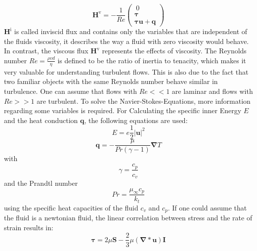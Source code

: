 \documentclass[a4paper,10pt]{article}
\renewcommand*\vec[1]{\boldsymbol{#1}}
\renewcommand*\matrix[1]{\boldsymbol{#1}}
\numberwithin{equation}{section} %
\begin{document}
\begin{equation}
 \vec{H^\mathrm{v}} = - \frac{1}{Re} \left( \begin{array}{c}\ 0 \\ \matrix{\tau}\\ \matrix{\tau} \vec{u} + \vec{q} \end{array} \right)
\end{equation}
\nomenclature{$\matrix{\tau}$}{Stress tensor}
\nomenclature{$\vec{q}$}{Heat conduction}
$ \vec{H^\mathrm{i}} $ is called inviscid flux and contains only the variables that are independent of the fluids viscosity, it describes the way a fluid 
with zero viscosity would behave. In contrast, the viscous flux $ \vec{H^\mathrm{v}} $ represents the effects of viscosity. The Reynolds number 
$ Re = \frac{\rho v d}{\eta} $ is defined to be the ratio of inertia to tenacity, which makes it very valuable for understanding turbulent flows. This is also due to the 
fact that two familiar objects with the same Reynolds number behave similar in turbulence. One can assume that flows with $ Re << 1 $ are laminar and flows with 
$ Re >> 1 $ are turbulent.
To solve the Navier-Stokes-Equations, more information regarding some variables is required. For Calculating the specific inner Energy $ E $ 
and the heat conduction $ \vec{q} $, the following equations are used:
\begin{equation}
 E = e  \frac{1}{2} \vec{|u|}^2
\end{equation}
\begin{equation}
 \vec{q} = - \frac{\mu}{Pr (\gamma - 1)} \vec\nabla T
\end{equation}
with 
\begin{equation}
 \gamma = \frac{c_p}{c_v}
\end{equation}
and the Prandtl number
\begin{equation}
 Pr = \frac{\mu_\infty c_p}{k_t}
\end{equation}
using the specific heat capacities of the fluid $ c_v $ and $ c_p $.
If one could assume that the fluid is a newtonian fluid, the linear correlation between stress and the rate of strain results in:
\begin{equation}
 \matrix{\tau} = 2 \mu \matrix{S} - \frac{2}{3} \mu (\vec\nabla * \vec{u}) \matrix{I}
\end{equation}
\end{document}
